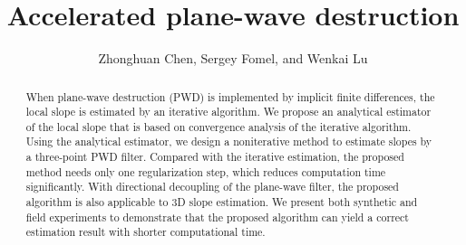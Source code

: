 
\title{Accelerated plane-wave destruction}

\address{
\footnotemark[1] Department of Automation,\\
State Key Laboratory of Intelligent Technology and Systems\\
Tsinghua National Laboratory for Information Science and Technology \\
Tsinghua University \\
Beijing, China. 100084 \\
Email: zhonghuanchen@gmail.com. \\
\footnotemark[2]Bureau of Economic Geology, \\
Jackson School of Geosciences \\
The University of Texas at Austin \\
University Station, Box X \\
Austin, TX 78713-8924\\
Email: sergey.fomel@beg.utexas.edu. 
}

\author{Zhonghuan Chen\footnotemark[1],
 Sergey Fomel\footnotemark[2], and Wenkai Lu\footnotemark[1]}


\newcommand {\txt}{\textrm}
\newcommand {\vct}{\mathbf}
\newcommand {\mtx}{\tensor}
\newcommand \discriminant D


\maketitle

\begin{abstract}
When plane-wave destruction (PWD) is implemented by implicit finite differences,
the local slope is estimated by an iterative algorithm.
We propose an analytical estimator of the local slope 
that is based on convergence analysis of the iterative algorithm. 
Using the analytical estimator, 
we design a noniterative method 
to estimate slopes by a three-point PWD filter.
Compared with the iterative estimation, 
the proposed method needs only one regularization step,
which reduces computation time significantly.
With directional decoupling of the plane-wave filter,
the proposed algorithm is also applicable to 3D slope estimation.
We present both synthetic and field
experiments to demonstrate that the proposed algorithm can yield
a correct estimation result with shorter computational time.
\end{abstract}


